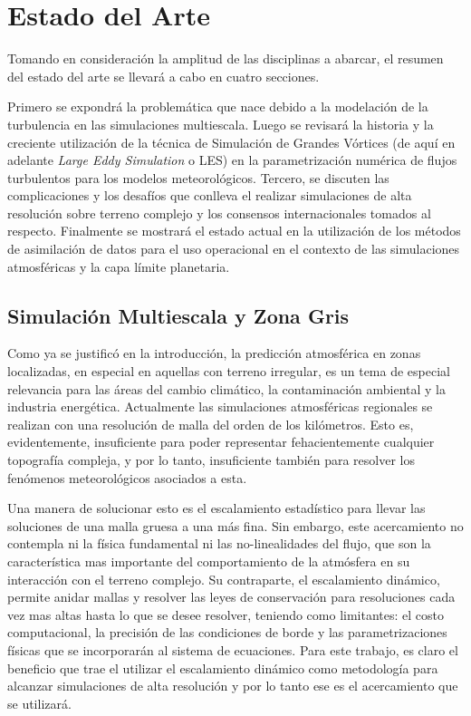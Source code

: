 \chapter{Estado del Arte}
Tomando en consideración la amplitud de las disciplinas a abarcar, el resumen del estado del arte se llevará a cabo en cuatro secciones. 

Primero se expondrá la problemática que nace debido a la modelación de la turbulencia en las simulaciones multiescala. Luego se revisará la historia y la creciente utilización de la técnica de Simulación de Grandes Vórtices (de aquí en adelante \emph{Large Eddy Simulation} o LES) en la parametrización numérica de flujos turbulentos para los modelos meteorológicos. Tercero, se discuten las complicaciones y los desafíos que conlleva el realizar simulaciones de alta resolución sobre terreno complejo y los consensos internacionales tomados al respecto. Finalmente se mostrará el estado actual en la utilización de los métodos de asimilación de datos para el uso operacional en el contexto de las simulaciones atmosféricas y la capa límite planetaria.
\newpage
\section{Simulación Multiescala y Zona Gris}
Como ya se justificó en la introducción, la predicción atmosférica en zonas localizadas, en especial en aquellas con terreno irregular, es un tema de especial relevancia para las áreas del cambio climático, la contaminación ambiental y la industria energética. Actualmente las simulaciones atmosféricas regionales se realizan con una resolución de malla del orden de los kilómetros. Esto es, evidentemente, insuficiente para poder representar fehacientemente cualquier topografía compleja, y por lo tanto, insuficiente también para resolver los fenómenos meteorológicos asociados a esta.

Una manera de solucionar esto es el escalamiento estadístico para llevar las soluciones de una malla gruesa a una más fina. Sin embargo, este acercamiento no contempla ni la física fundamental ni las no-linealidades del flujo, que son la característica mas importante del comportamiento de la atmósfera en su interacción con el terreno complejo. Su contraparte, el escalamiento dinámico, permite anidar mallas y resolver las leyes de conservación para resoluciones cada vez mas altas hasta lo que se desee resolver, teniendo como limitantes: el costo computacional, la precisión de las condiciones de borde y las parametrizaciones físicas que se incorporarán al sistema de ecuaciones. Para este trabajo, es claro el beneficio que trae el utilizar el escalamiento dinámico como metodología para alcanzar simulaciones de alta resolución y por lo tanto ese es el acercamiento que se utilizará.


